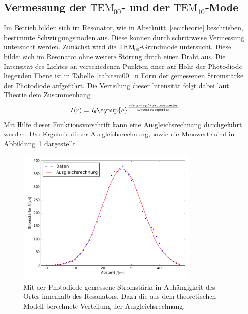 \subsection{Vermessung der $\text{TEM}_{00}$- und der $\text{TEM}_{10}$-Mode}
%
Im Betrieb bilden sich im Resonator, wie in Abschnitt~\ref{sec:theorie} beschrieben, bestimmte Schwingungsmoden aus. Diese können durch
schrittweise Vermessung untersucht werden. Zunächst wird die $\text{TEM}_{00}$-Grundmode untersucht. Diese bildet sich im Resonator ohne weitere
Störung durch einen Draht aus. Die Intensität des Lichtes an verschiedenen Punkten einer auf Höhe der Photodiode liegenden Ebene ist in
Tabelle~\ref{tab:tem00} in Form der gemessenen Stromstärke der Photodiode aufgeführt. Die Verteilung dieser Intensität folgt dabei laut Theorie
dem Zusammenhang
%
\begin{equation}
  I(r)=I_0 \symup{e}^{\frac{-2(x-x_0)²}{\omega²}} \; .
\end{equation}
%
Mit Hilfe dieser Funktionsvorschrift kann eine Ausgleichsrechnung durchgeführt werden. Das Ergebnis dieser Ausgleichsrechnung, sowie die Messwerte sind in Abbildung~\ref{fig:tem00} dargestellt.
%
\begin{figure}[htb]
  \centering
  \includegraphics[width=0.8\textwidth]{auswertung/plot_Mode00.pdf}
  \caption{Mit der Photodiode gemessene Stromstärke in Abhängigkeit des Ortes innerhalb des Resonators. Dazu die aus dem theoretischen Modell berechnete Verteilung der Ausgleichsrechnung.}
  \label{fig:tem00}
\end{figure}
%
%
